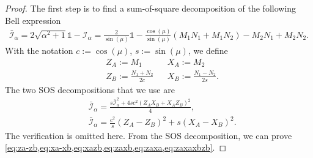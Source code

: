 \documentclass[11pt,letterpaper]{article}
\newcommand{\1}{\mathbb{1}}
\newcommand{\I}{\mathcal{I}}
\theoremstyle{definition}
\begin{document}
\begin{proof}
The first step is to find a sum-of-square decomposition of 
the following Bell expression
\begin{align}
	\bar{\I}_\alpha = 2\sqrt{\alpha^2+1} \1 - \I_\alpha
	= \frac{2}{\sin(\mu)} \1 - \frac{\cos(\mu)}{\sin(\mu)}(M_1N_1+M_1N_2) -  M_2N_1 + M_2N_2.
\end{align} 
With the notation $c:= \cos(\mu)$, $s := \sin(\mu)$, 
we define
\begin{align*}
	&Z_A := M_1 && X_A := M_2\\
	&Z_B := \frac{N_1+N_2}{2c} && X_B := \frac{N_1-N_2}{2s}.
\end{align*}
The two SOS decompositions that we use are
\begin{align}
	\label{eq:sos1}&\bar{\I}_\alpha = \frac{s \bar{\I}_\alpha^2 + 4sc^2(Z_AX_B+X_AZ_B)^2}{4},\\
	\label{eq:sos2}&\bar{\I}_\alpha = \frac{c^2}{s}(Z_A-Z_B)^2 + s(X_A-X_B)^2.
\end{align}
The verification is omitted here. From the SOS decomposition, we can prove \cref{eq:za-zb,eq:xa-xb,eq:xazb,eq:zaxb,eq:zaxa,eq:zaxaxbzb}.


\end{proof}
\end{document}
